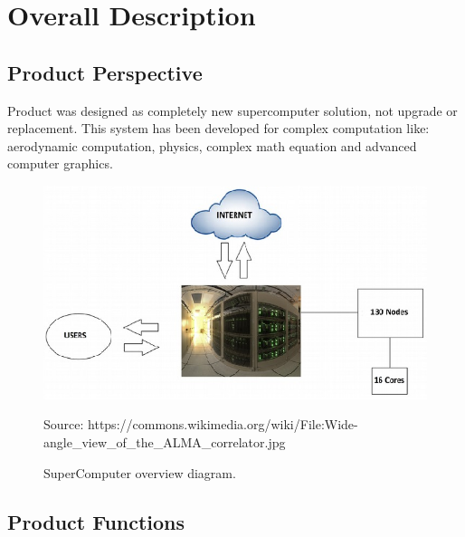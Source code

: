\documentclass{scrreprt}
\begin{document}
\chapter{Overall Description}

\section{Product Perspective}
Product was designed as completely new supercomputer solution, not upgrade or replacement. This system has been developed for complex computation like: aerodynamic computation, physics, complex math equation and advanced computer graphics.


\begin{figure}[h!]
\centering
\includegraphics{1.png}
\caption{SuperComputer overview diagram.}
Source: https://commons.wikimedia.org/wiki/File:Wide-angle_view_of_the_ALMA_correlator.jpg
\end{figure}




\section{Product Functions}
\end{document}
